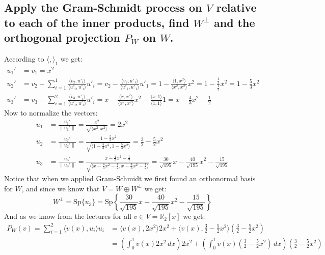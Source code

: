 \documentclass[11pt,a4paper]{article}
\theoremstyle{plain}
\newcommand{\Sp}{\text{Sp}}
\newcommand{\R}{\mathbb{R}}
\begin{document}
	\subsection{Apply the Gram-Schmidt process on $V$ relative to each of the
	inner products, find $W^\bot$ and the orthogonal projection $P_W$ on $W$.}
	According to $\langle ,\rangle_1$ we get:
	\begin{align*}
		u_1' &= v_1 = x^2 \\
		u_2' &= v_2 - \sum_{i=1}^{1}
		{\frac{\langle v_2,u'_i\rangle}{\langle u'_i,u'_i\rangle}u'_i} = 
		v_2 - \frac{\langle v_2,u'_1\rangle}{\langle u'_1,u'_1\rangle} u'_1 = 
		1 - \frac{\langle 1,x^2\rangle}{\langle x^2,x^2\rangle} x^2 = 
		1 - \frac{\frac{1}{3}}{\frac{1}{5}} x^2 = 1 - \frac{5}{3}x^2 \\
		u_3' &= v_3 - \sum_{i=1}^{2}
		{\frac{\langle v_3,u'_i\rangle}{\langle u'_i,u'_i\rangle}u'_i} = 
		x - \frac{\langle x,x^2\rangle}{\langle x^2,x^2\rangle}x^2 - 
		\frac{\langle x,1\rangle}{\langle 1,1\rangle}1 = 
		x - \frac{4}{3}x^2 - \frac{1}{2}
	\end{align*}
	Now to normalize the vectors:
	\begin{align*}
		u_1 &= \frac{u_1'}{\|u_1'\|} = 
		\frac{x^2}{\sqrt{\langle x^2,x^2\rangle}} = 2x^2
		\\
		u_2 &= \frac{u_2'}{\|u_2'\|} = 
		\frac{1-\frac{5}{3}x^2}
		{\sqrt{\langle 1-\frac{5}{3}x^2,1-\frac{5}{3}x^2\rangle}} = 
		\frac{3}{2}-\frac{5}{2}x^2
		\\
		u_3 &= \frac{u_3'}{\|u_3'\|} = 
		\frac{x - \frac{4}{3}x^2 - \frac{1}{2}}
		{\sqrt{\langle x - \frac{4}{3}x^2 - \frac{1}{2},x - \frac{4}{3}x^2 - 
		\frac{1}{2}\rangle}} = 
		\frac{30}{\sqrt{195}}x-\frac{40}{\sqrt{195}}x^2-\frac{15}{\sqrt{195}}
	\end{align*}
	Notice that when we applied Gram-Schmidt we first found an orthonormal basis
	for $W$, and since we know that $V = W \oplus W^\bot$ we get:
	\[ W^\bot = \Sp\{u_3\} = \Sp
	\left\{\frac{30}{\sqrt{195}}x-\frac{40}{\sqrt{195}}
	x^2-\frac{15}{\sqrt{195}} \right\} \]
	And as we know from the lectures for all $v\in V = \R_2[x]$ we get:
	\begin{align*}
		P_W(v) = \sum_{i=1}^{2}{\langle v(x),u_i \rangle u_i} &= 
		\langle v(x),2x^2 \rangle 2x^2 + \langle v(x),\frac{3}{2} - 
		\frac{5}{2}x^2 \rangle \left(\frac{3}{2}-\frac{5}{2}x^2\right) \\ &= 
		\left(\int_{0}^{1}{v(x) 2x^2\,dx}\right) 2x^2 + 
		\left(\int_{0}^{1}{v(x)\left(\frac{3}{2} - \frac{5}{2}x^2\right)\,dx}
		\right) \left(\frac{3}{2}-\frac{5}{2}x^2\right)
	\end{align*}
	
\end{document}
